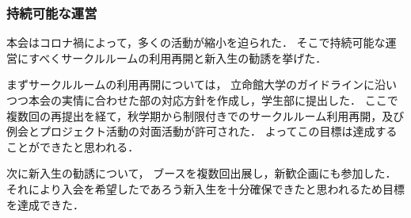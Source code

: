 \subsubsection*{持続可能な運営}
本会はコロナ禍によって，多くの活動が縮小を迫られた．
そこで持続可能な運営にすべくサークルルームの利用再開と新入生の勧誘を挙げた．

まずサークルルームの利用再開については，
立命館大学のガイドラインに沿いつつ本会の実情に合わせた部の対応方針を作成し，学生部に提出した．
ここで複数回の再提出を経て，秋学期から制限付きでのサークルルーム利用再開，及び例会とプロジェクト活動の対面活動が許可された．
よってこの目標は達成することができたと思われる．

次に新入生の勧誘について，
ブースを複数回出展し，新歓企画にも参加した．
それにより入会を希望したであろう新入生を十分確保できたと思われるため目標を達成できた．
